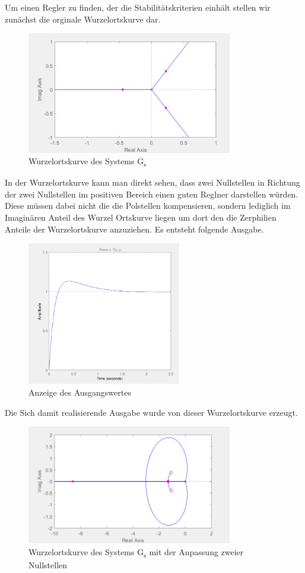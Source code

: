 \documentclass[10pt]{scrartcl}
\begin{document}
Um einen Regler zu finden, der die Stabilitätskriterien einhält stellen wir zunächst die orginale Wurzelortskurve dar.
\begin{figure}[H]
	\centering
	\includegraphics[width=0.8\textwidth]{WOZ9f}
	\caption{Wurzelortskurve des Systems G\textsubscript{s}}
	\label{img:grafik-dummy}
\end{figure}
In der Wurzelortskurve kann man direkt sehen, dass zwei Nullstellen in Richtung der zwei Nullstellen im positiven Bereich einen guten Reglner darstellen würden. Diese müssen dabei nicht die die Polstellen kompensieren, sondern lediglich im Imaginären Anteil des Wurzel Ortskurve liegen um dort den die Zerphilien Anteile der Wurzelortskurve anzuziehen.
Es entsteht folgende Ausgabe.
\begin{figure}[H]
	\centering
	\includegraphics[width=0.6\textwidth]{WOZ9f2}
	\caption{Anzeige des Ausgangswertes}
	\label{img:grafik-dummy}
\end{figure}

Die Sich damit realisierende Ausgabe wurde von dieser Wurzelortskurve erzeugt.
\begin{figure}[H]
	\centering
	\includegraphics[width=0.8\textwidth]{WOZ9f3}
	\caption{Wurzelortskurve des Systems G\textsubscript{s} mit der Anpassung zweier Nullstellen}
	\label{img:grafik-dummy}
\end{figure}
\end{document}
